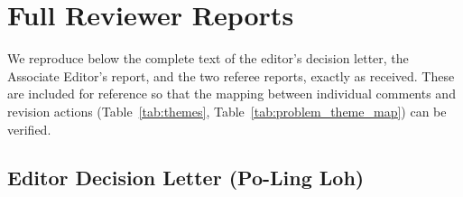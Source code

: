 \appendix
\section{Full Reviewer Reports}
\label{app:reviews}

We reproduce below the complete text of the editor's decision letter,
the Associate Editor's report, and the two referee reports, exactly
as received.
These are included for reference so that the mapping between
individual comments and revision actions
(Table~\ref{tab:themes}, Table~\ref{tab:problem_theme_map})
can be verified.


\subsection{Editor Decision Letter (Po-Ling Loh)}
\label{app:editor}

